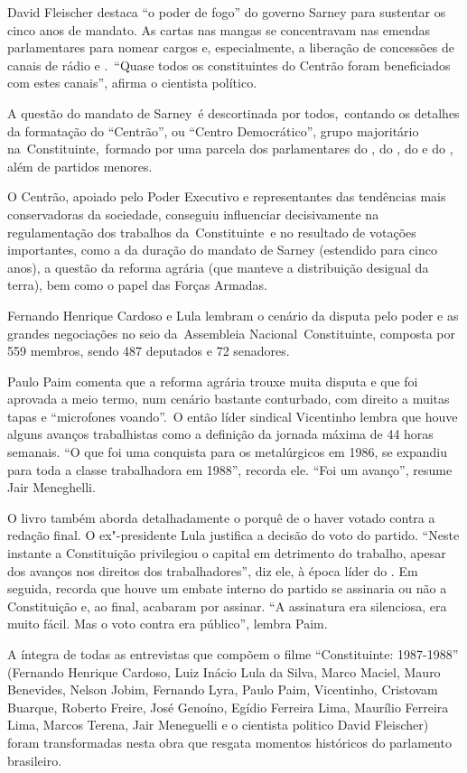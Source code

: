 David Fleischer destaca ``o poder de fogo'' do governo Sarney para
sustentar os cinco anos de mandato. As cartas nas mangas se concentravam
nas emendas parlamentares para nomear cargos e, especialmente, a
liberação de concessões de canais de rádio e .~``Quase todos os
constituintes do Centrão foram beneficiados com estes canais'', afirma o
cientista político.

A questão do mandato de Sarney~é descortinada por todos,~contando os
detalhes da formatação do ``Centrão'', ou ``Centro Democrático'', grupo
majoritário na~Constituinte,~formado por uma parcela dos parlamentares
do , do , do  e do , além de partidos menores.

O Centrão, apoiado pelo Poder Executivo e representantes das tendências
mais conservadoras da sociedade, conseguiu influenciar decisivamente na
regulamentação dos trabalhos da~Constituinte~e no resultado de votações
importantes, como a da duração do mandato de Sarney (estendido para
cinco anos), a questão da reforma agrária (que manteve a distribuição
desigual da terra), bem como o papel das Forças Armadas.

Fernando Henrique Cardoso e Lula lembram o cenário da disputa pelo poder
e as grandes negociações no seio da~Assembleia Nacional~Constituinte,
composta por 559 membros, sendo 487 deputados e 72 senadores.

Paulo Paim comenta que a reforma agrária trouxe muita disputa e que foi
aprovada a meio termo, num cenário bastante conturbado, com direito a
muitas tapas e ``microfones voando''.~O então líder sindical Vicentinho
lembra que houve alguns avanços trabalhistas como a definição da jornada
máxima de 44 horas semanais. ``O que foi uma conquista para os
metalúrgicos em 1986, se expandiu para toda a classe trabalhadora em
1988'', recorda ele. ``Foi um avanço'', resume Jair Meneghelli.

O livro também aborda detalhadamente o porquê de o  haver votado
contra a redação final. O ex"-presidente Lula justifica a decisão do voto
do partido. ``Neste instante a Constituição privilegiou o capital em
detrimento do trabalho, apesar dos avanços nos direitos dos
trabalhadores'', diz ele, à época líder do . Em seguida, recorda que
houve um embate interno do partido se assinaria ou não a Constituição e,
ao final, acabaram por assinar. ``A assinatura era silenciosa, era muito
fácil. Mas o voto contra era público'', lembra Paim.

A íntegra de todas as entrevistas que compõem o filme ``Constituinte:
1987-1988'' (Fernando Henrique Cardoso, Luiz Inácio Lula da Silva, Marco
Maciel, Mauro Benevides, Nelson Jobim, Fernando Lyra, Paulo Paim,
Vicentinho, Cristovam Buarque, Roberto Freire, José Genoíno, Egídio
Ferreira Lima, Maurílio Ferreira Lima, Marcos Terena, Jair Meneguelli e
o cientista politico David Fleischer) foram transformadas nesta obra que
resgata momentos históricos do parlamento brasileiro.

